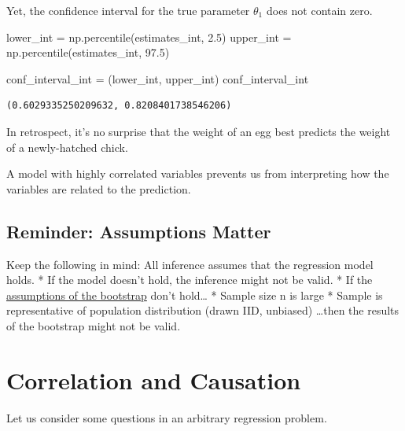 \documentclass[
  letterpaper,
  DIV=11,
  numbers=noendperiod]{scrreprt}
\newenvironment{Shaded}{\begin{snugshade}}{\end{snugshade}}
\newcommand{\FloatTok}[1]{\textcolor[rgb]{0.68,0.00,0.00}{#1}}
\newcommand{\NormalTok}[1]{\textcolor[rgb]{0.00,0.23,0.31}{#1}}
\newcommand{\OperatorTok}[1]{\textcolor[rgb]{0.37,0.37,0.37}{#1}}
\begin{document}
Yet, the confidence interval for the true parameter \(\theta_{1}\) does
not contain zero.

\begin{Shaded}
\begin{Highlighting}[]
\NormalTok{lower\_int }\OperatorTok{=}\NormalTok{ np.percentile(estimates\_int, }\FloatTok{2.5}\NormalTok{)}
\NormalTok{upper\_int }\OperatorTok{=}\NormalTok{ np.percentile(estimates\_int, }\FloatTok{97.5}\NormalTok{)}

\NormalTok{conf\_interval\_int }\OperatorTok{=}\NormalTok{ (lower\_int, upper\_int)}
\NormalTok{conf\_interval\_int}
\end{Highlighting}
\end{Shaded}

\begin{verbatim}
(0.6029335250209632, 0.8208401738546206)
\end{verbatim}

In retrospect, it's no surprise that the weight of an egg best predicts
the weight of a newly-hatched chick.

A model with highly correlated variables prevents us from interpreting
how the variables are related to the prediction.

\hypertarget{reminder-assumptions-matter}{%
\subsection{Reminder: Assumptions
Matter}\label{reminder-assumptions-matter}}

Keep the following in mind: All inference assumes that the regression
model holds. * If the model doesn't hold, the inference might not be
valid. * If the
\href{https://inferentialthinking.com/chapters/13/3/Confidence_Intervals.html?highlight=p\%20value\%20confidence\%20interval\#care-in-using-the-bootstrap-percentile-method}{assumptions
of the bootstrap} don't hold\ldots{} * Sample size n is large * Sample
is representative of population distribution (drawn IID, unbiased)
\ldots then the results of the bootstrap might not be valid.

\hypertarget{correlation-and-causation}{%
\section{Correlation and Causation}\label{correlation-and-causation}}

Let us consider some questions in an arbitrary regression problem.
\end{document}
